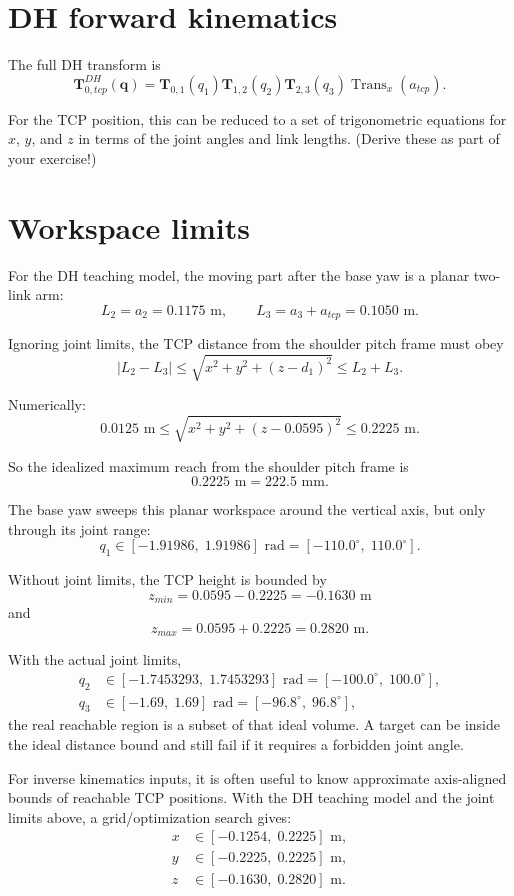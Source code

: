 \documentclass[11pt]{article}
\newcommand{\T}{\mathbf{T}}
\newcommand{\q}{\mathbf{q}}
\newcommand{\Transx}{\operatorname{Trans}_x}
\begin{document}
\section{DH forward kinematics}
The full DH transform is
\[
\T_{0,tcp}^{DH}(\q)
=
\T_{0,1}(q_1)\T_{1,2}(q_2)\T_{2,3}(q_3)\Transx(a_{tcp}).
\]

For the TCP position, this can be reduced to a set of trigonometric equations for \(x\), \(y\), and \(z\) in terms of the joint angles and link lengths. (Derive these as part of your exercise!)

\section{Workspace limits}
For the DH teaching model, the moving part after the base yaw is a planar
two-link arm:
\[
L_2 = a_2 = 0.1175\text{ m}, \qquad
L_3 = a_3+a_{tcp} = 0.1050\text{ m}.
\]

Ignoring joint limits, the TCP distance from the shoulder pitch frame must obey
\[
|L_2-L_3| \leq \sqrt{x^2+y^2+(z-d_1)^2} \leq L_2+L_3.
\]

Numerically:
\[
0.0125\text{ m} \leq
\sqrt{x^2+y^2+(z-0.0595)^2}
\leq 0.2225\text{ m}.
\]

So the idealized maximum reach from the shoulder pitch frame is
\[
0.2225\text{ m} = 222.5\text{ mm}.
\]

The base yaw sweeps this planar workspace around the vertical axis, but only
through its joint range:
\[
q_1 \in [-1.91986,\;1.91986]\text{ rad}
= [-110.0^\circ,\;110.0^\circ].
\]

Without joint limits, the TCP height is bounded by
\[
z_{min} = 0.0595 - 0.2225 = -0.1630\text{ m}
\]
and
\[
z_{max} = 0.0595 + 0.2225 = 0.2820\text{ m}.
\]

With the actual joint limits,
\[
\begin{aligned}
q_2 &\in [-1.7453293,\;1.7453293]\text{ rad}
= [-100.0^\circ,\;100.0^\circ],\\
q_3 &\in [-1.69,\;1.69]\text{ rad}
= [-96.8^\circ,\;96.8^\circ],
\end{aligned}
\]
the real reachable region is a subset of that ideal volume. A target can be
inside the ideal distance bound and still fail if it requires a forbidden joint
angle.

For inverse kinematics inputs, it is often useful to know approximate
axis-aligned bounds of reachable TCP positions. With the DH teaching model and
the joint limits above, a grid/optimization search gives:
\[
\begin{aligned}
x &\in [-0.1254,\;0.2225]\text{ m},\\
y &\in [-0.2225,\;0.2225]\text{ m},\\
z &\in [-0.1630,\;0.2820]\text{ m}.
\end{aligned}
\]
\end{document}

